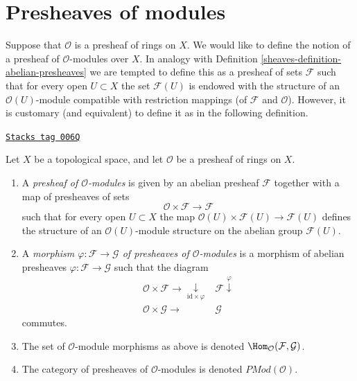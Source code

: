 \section{Presheaves of modules}
\label{sheaves-section-presheaves-modules}
Suppose that $\mathcal{O}$ is a presheaf of rings on $X$.
We would like to define the notion of a presheaf of
$\mathcal{O}$-modules over $X$. In analogy with Definition
\ref{sheaves-definition-abelian-presheaves} we are tempted to define
this as a presheaf of sets $\mathcal{F}$ such that for every open
$U \subset X$ the set $\mathcal{F}(U)$ is endowed with the structure
of an $\mathcal{O}(U)$-module compatible with restriction mappings
(of $\mathcal{F}$ and $\mathcal{O}$). However, it is customary
(and equivalent) to define it as in the following definition.

\begin{definition}
\label{sheaves-definition-presheaf-modules}
\href{https://stacks.math.columbia.edu/tag/006Q}{\texttt{Stacks tag 006Q}}

Let $X$ be a topological space, and let $\mathcal{O}$ be
a presheaf of rings on $X$.
\begin{enumerate}
\item A {\it presheaf of $\mathcal{O}$-modules}
is given by an abelian presheaf $\mathcal{F}$ together with a
map of presheaves of sets
$$
\mathcal{O} \times \mathcal{F} \longrightarrow \mathcal{F}
$$
such that for every open $U \subset X$ the map
$\mathcal{O}(U) \times \mathcal{F}(U) \to \mathcal{F}(U)$
defines the structure of an $\mathcal{O}(U)$-module
structure on the abelian group $\mathcal{F}(U)$.
\item A {\it morphism $\varphi : \mathcal{F} \to \mathcal{G}$
of presheaves of $\mathcal{O}$-modules} is a morphism of abelian presheaves
$\varphi : \mathcal{F} \to \mathcal{G}$ such that
the diagram
$$
\begin{array}{cc}\mathcal{O} \times \mathcal{F} \longrightarrow\underset{\text{id} \times \varphi}{\downarrow} & \mathcal{F} \overset{\varphi}{\downarrow} \\ \mathcal{O} \times \mathcal{G} \longrightarrow & \mathcal{G}\end{array}
$$
commutes.
\item The set of $\mathcal{O}$-module morphisms as above is
denoted $\Hom_\mathcal{O}(\mathcal{F}, \mathcal{G})$.
\item The category of presheaves of $\mathcal{O}$-modules
is denoted $\textit{PMod}(\mathcal{O})$.
\end{enumerate}
\end{definition}

